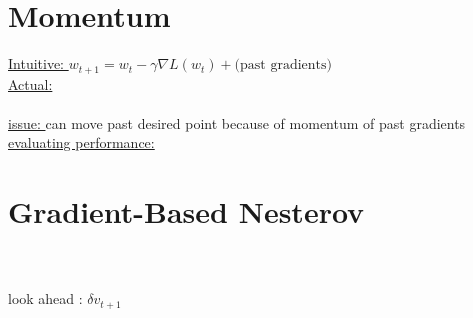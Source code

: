 \section{Momentum}
\underline{Intuitive: } $w_{t+1}=w_t-\gamma \nabla L(w_t) + \text{(past gradients)}$\\
\underline{Actual: }\\ 
\\
\underline{issue: } can move past desired point because of momentum of past gradients\\
\underline{evaluating performance: } \\

\section{Gradient-Based Nesterov}
\\
\\
look ahead : $\delta v_{t+1}$

